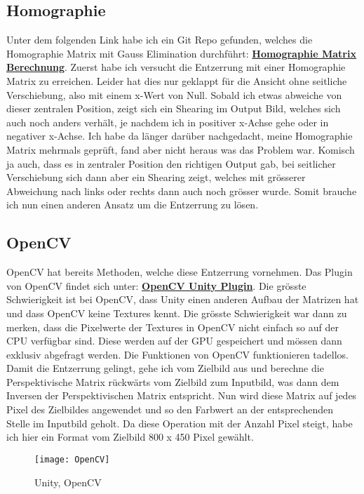 \subsection{Homographie}
Unter dem folgenden Link habe ich ein Git Repo gefunden, welches die Homographie Matrix mit Gauss Elimination durchführt: 
\href{https://github.com/chiragraman/Unity3DProjectionMapping/blob/master/Assets/Scripts/Homography.cs}{\textbf{Homographie Matrix Berechnung}}.
Zuerst habe ich versucht die Entzerrung mit einer Homographie Matrix zu erreichen. Leider hat dies nur geklappt für die Ansicht ohne seitliche Verschiebung, also mit einem x-Wert von Null. Sobald ich etwas abweiche von dieser zentralen Position, zeigt sich ein Shearing im Output Bild, welches sich auch noch anders verhält, je nachdem ich in positiver x-Achse gehe oder in negativer x-Achse. 
Ich habe da länger darüber nachgedacht, meine Homographie Matrix mehrmals geprüft, fand aber nicht heraus was das Problem war. Komisch ja auch, dass es in zentraler Position den richtigen Output gab, bei seitlicher Verschiebung sich dann aber ein Shearing zeigt, welches mit grösserer Abweichung nach links oder rechts dann auch noch grösser wurde.
Somit brauche ich nun einen anderen Ansatz um die Entzerrung zu lösen.

\subsection{OpenCV}
OpenCV hat bereits Methoden, welche diese Entzerrung vornehmen. Das Plugin von OpenCV findet sich unter: \href{https://github.com/EnoxSoftware/OpenCVForUnity/tree/master/Assets/OpenCVForUnity}{\textbf{OpenCV Unity Plugin}}.
Die grösste Schwierigkeit ist bei OpenCV, dass Unity einen anderen Aufbau der Matrizen hat und dass OpenCV keine Textures kennt. 
Die grösste Schwierigkeit war dann zu merken, dass die Pixelwerte der Textures in OpenCV nicht einfach so auf der CPU verfügbar sind. Diese werden auf der GPU gespeichert und mössen dann exklusiv abgefragt werden.
Die Funktionen von OpenCV funktionieren tadellos. Damit die Entzerrung gelingt, gehe ich vom Zielbild aus und berechne die Perspektivische Matrix rückwärts vom Zielbild zum Inputbild, was dann dem Inversen der Perspektivischen Matrix entspricht. 
Nun wird diese Matrix auf jedes Pixel des Zielbildes angewendet und so den Farbwert an der entsprechenden Stelle im Inputbild geholt. 
Da diese Operation mit der Anzahl Pixel steigt, habe ich hier ein Format vom Zielbild 800 x 450 Pixel gewählt.

\begin{figure}[H]
	\texttt{[image: OpenCV]}
	\caption{Unity, OpenCV}
	\label{fig:OpenCV}
\end{figure}

